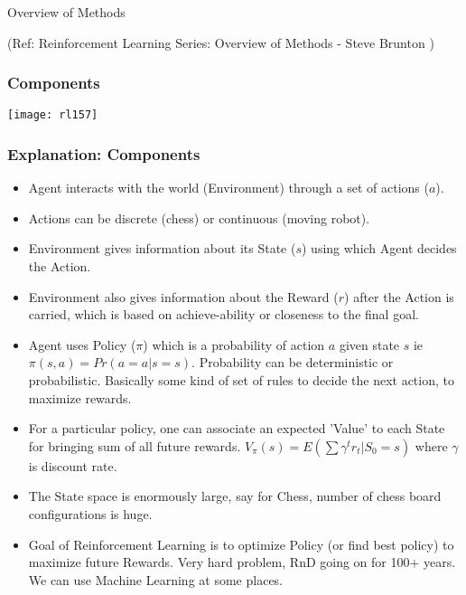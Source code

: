 \begin{frame}[fragile]\frametitle{}
\begin{center}
{\Large Overview of Methods}

{\tiny (Ref: Reinforcement Learning Series: Overview of Methods - Steve Brunton )}
\end{center}
\end{frame}





\begin{frame}[fragile]\frametitle{Components}

\begin{center}
\texttt{[image: rl157]}
\end{center}

\end{frame}

\begin{frame}[fragile]\frametitle{Explanation: Components}

\begin{itemize}
\item Agent interacts with the world (Environment) through a set of actions ($a$). 
\item Actions can be discrete (chess) or continuous (moving robot).
\item Environment gives information about its State ($s$) using which Agent decides the Action.
\item Environment also gives information about the Reward ($r$) after the Action is carried, which is based on achieve-ability or closeness to the final goal.
\item Agent uses Policy ($\pi$) which is a probability of action $a$ given state $s$ ie $\pi (s,a) = Pr(a = a| s = s)$. Probability can be deterministic or probabilistic. Basically some kind of set of rules to decide the next action, to maximize rewards.
\item For a particular policy, one can associate an expected 'Value' to each State for bringing sum of all future rewards. $V_{\pi}(s) = E (\sum {\gamma}^t r_t | S_0 = s)$ where $\gamma$ is discount rate.
\item The State space is enormously large, say for Chess, number of chess board configurations is huge.
\item Goal of Reinforcement Learning is to optimize Policy (or find best policy) to maximize future Rewards. Very hard problem, RnD going on for 100+ years. We can use Machine Learning at some places.
\end{itemize}

\end{frame}



